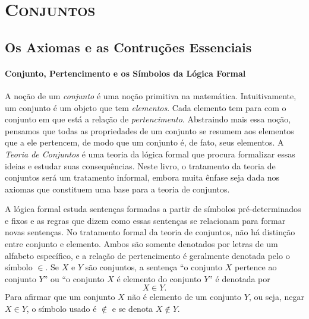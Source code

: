 \part{{\scshape Conjuntos}}

\chapter{Os Axiomas e as Contruções Essenciais}

\subsection*{Conjunto, Pertencimento e os Símbolos da Lógica Formal}

A noção de um \emph{conjunto} é uma noção primitiva na matemática. Intuitivamente, um conjunto é um objeto que tem \emph{elementos}. Cada elemento tem para com o conjunto em que está a relação de \emph{pertencimento}. Abstraindo mais essa noção, pensamos que todas as propriedades de um conjunto se resumem aos elementos que a ele pertencem, de modo que um conjunto é, de fato, seus elementos. A \emph{Teoria de Conjuntos} é uma teoria da lógica formal que procura formalizar essas ideias e estudar suas consequências. Neste livro, o tratamento da teoria de conjuntos será um tratamento informal, embora muita ênfase seja dada nos axiomas que constituem uma base para a teoria de conjuntos.

A lógica formal estuda sentenças formadas a partir de símbolos pré-determinados e fixos e as regras que dizem como essas sentenças se relacionam para formar novas sentenças. No tratamento formal da teoria de conjuntos, não há distinção entre conjunto e elemento. Ambos são somente denotados por letras de um alfabeto específico, e a relação de pertencimento é geralmente denotada pelo o símbolo $\in$. Se $X$ e $Y$ são conjuntos, a sentença ``o conjunto $X$ pertence ao conjunto $Y$'' ou ``o conjunto $X$ é elemento do conjunto $Y$'' é denotada por 
	\begin{equation*}
	X \in Y.
	\end{equation*}
Para afirmar que um conjunto $X$ não é elemento de um conjunto $Y$, ou seja, negar $X \in Y$, o símbolo usado é $\notin$ e se denota $X \notin Y$.

